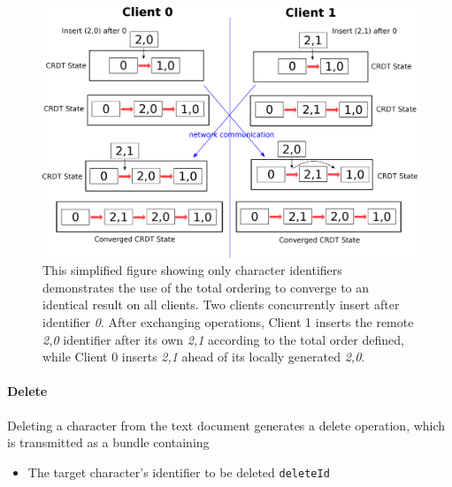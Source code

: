 \documentclass[12pt,a4paper,twoside,openright]{report}
\begin{document}
				
			\begin{figure}[H]
				\centering
				\includegraphics[width=1\linewidth]{figs/totalordering.eps}
				\caption[Convergence using Total Order]{This simplified figure showing only character identifiers demonstrates the use of the total ordering to converge to an identical result on all clients. Two clients concurrently insert after identifier \textit{0}. After exchanging operations, Client 1 inserts the remote \textit{2,0} identifier after its own \textit{2,1} according to the total order defined, while Client 0 inserts \textit{2,1} ahead of its locally generated \textit{2,0}.}
				\label{fig:totalorder}
			\end{figure}
				
			\paragraph{Delete}
				Deleting a character from the text document generates a delete operation, which is transmitted as a bundle containing
				\begin{itemize}
					\item The target character's identifier to be deleted \texttt{deleteId}
				\end{itemize}
				
\end{document}
